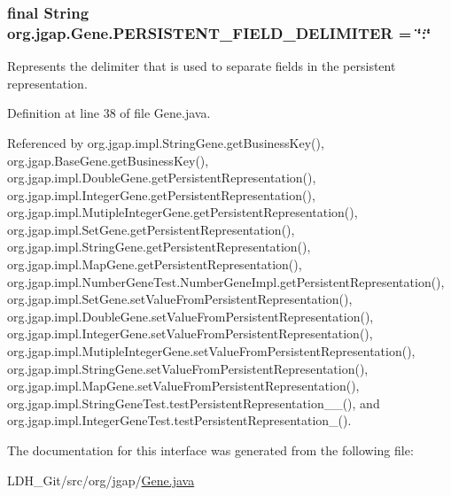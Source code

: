 \hypertarget{interfaceorg_1_1jgap_1_1_gene_ae49de1c9f46601f1b60d393a9ce3901a}{
\subsubsection[{P\-E\-R\-S\-I\-S\-T\-E\-N\-T\-\_\-\-F\-I\-E\-L\-D\-\_\-\-D\-E\-L\-I\-M\-I\-T\-E\-R}]{\setlength{\rightskip}{0pt plus 5cm}final String org.\-jgap.\-Gene.\-P\-E\-R\-S\-I\-S\-T\-E\-N\-T\-\_\-\-F\-I\-E\-L\-D\-\_\-\-D\-E\-L\-I\-M\-I\-T\-E\-R = \char`\"{}\-:\char`\"{}\hspace{0.3cm}{\ttfamily [static]}}}\label{interfaceorg_1_1jgap_1_1_gene_ae49de1c9f46601f1b60d393a9ce3901a}
Represents the delimiter that is used to separate fields in the persistent representation. 

Definition at line 38 of file Gene.\-java.



Referenced by org.\-jgap.\-impl.\-String\-Gene.\-get\-Business\-Key(), org.\-jgap.\-Base\-Gene.\-get\-Business\-Key(), org.\-jgap.\-impl.\-Double\-Gene.\-get\-Persistent\-Representation(), org.\-jgap.\-impl.\-Integer\-Gene.\-get\-Persistent\-Representation(), org.\-jgap.\-impl.\-Mutiple\-Integer\-Gene.\-get\-Persistent\-Representation(), org.\-jgap.\-impl.\-Set\-Gene.\-get\-Persistent\-Representation(), org.\-jgap.\-impl.\-String\-Gene.\-get\-Persistent\-Representation(), org.\-jgap.\-impl.\-Map\-Gene.\-get\-Persistent\-Representation(), org.\-jgap.\-impl.\-Number\-Gene\-Test.\-Number\-Gene\-Impl.\-get\-Persistent\-Representation(), org.\-jgap.\-impl.\-Set\-Gene.\-set\-Value\-From\-Persistent\-Representation(), org.\-jgap.\-impl.\-Double\-Gene.\-set\-Value\-From\-Persistent\-Representation(), org.\-jgap.\-impl.\-Integer\-Gene.\-set\-Value\-From\-Persistent\-Representation(), org.\-jgap.\-impl.\-Mutiple\-Integer\-Gene.\-set\-Value\-From\-Persistent\-Representation(), org.\-jgap.\-impl.\-String\-Gene.\-set\-Value\-From\-Persistent\-Representation(), org.\-jgap.\-impl.\-Map\-Gene.\-set\-Value\-From\-Persistent\-Representation(), org.\-jgap.\-impl.\-String\-Gene\-Test.\-test\-Persistent\-Representation\-\_\-\_(), and org.\-jgap.\-impl.\-Integer\-Gene\-Test.\-test\-Persistent\-Representation\-\_().



The documentation for this interface was generated from the following file\-:\begin{DoxyCompactItemize}
\item 
L\-D\-H\-\_\-\-Git/src/org/jgap/\hyperlink{_gene_8java}{Gene.\-java}\end{DoxyCompactItemize}
